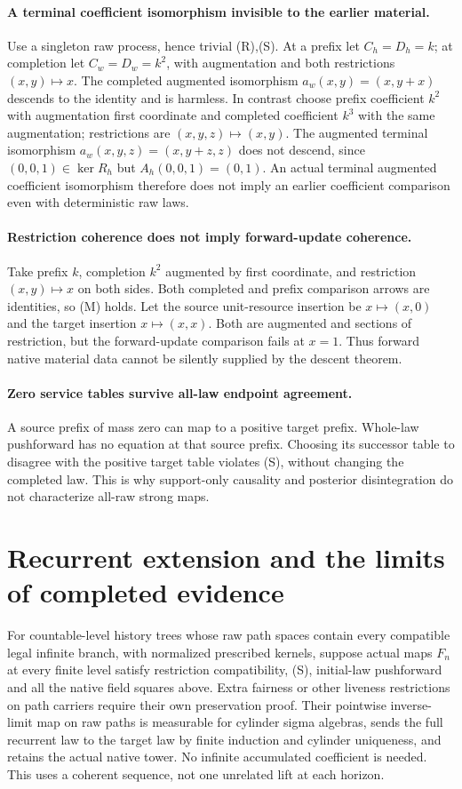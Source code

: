 \documentclass{article}
\begin{document}
\paragraph{A terminal coefficient isomorphism invisible to the earlier material.}
Use a singleton raw process, hence trivial (R),(S). At a prefix let $C_h=D_h=k$; at completion let $C_w=D_w=k^2$, with augmentation and both restrictions $(x,y)\mapsto x$. The completed augmented isomorphism $a_w(x,y)=(x,y+x)$ descends to the identity and is harmless. In contrast choose prefix coefficient $k^2$ with augmentation first coordinate and completed coefficient $k^3$ with the same augmentation; restrictions are $(x,y,z)\mapsto(x,y)$. The augmented terminal isomorphism $a_w(x,y,z)=(x,y+z,z)$ does not descend, since $(0,0,1)\in\ker R_h$ but $A_h(0,0,1)=(0,1)$. An actual terminal augmented coefficient isomorphism therefore does not imply an earlier coefficient comparison even with deterministic raw laws.

\paragraph{Restriction coherence does not imply forward-update coherence.}
Take prefix $k$, completion $k^2$ augmented by first coordinate, and restriction $(x,y)\mapsto x$ on both sides. Both completed and prefix comparison arrows are identities, so (M) holds. Let the source unit-resource insertion be $x\mapsto(x,0)$ and the target insertion $x\mapsto(x,x)$. Both are augmented and sections of restriction, but the forward-update comparison fails at $x=1$. Thus forward native material data cannot be silently supplied by the descent theorem.

\paragraph{Zero service tables survive all-law endpoint agreement.}
A source prefix of mass zero can map to a positive target prefix. Whole-law pushforward has no equation at that source prefix. Choosing its successor table to disagree with the positive target table violates (S), without changing the completed law. This is why support-only causality and posterior disintegration do not characterize all-raw strong maps.

\section{Recurrent extension and the limits of completed evidence}
For countable-level history trees whose raw path spaces contain every compatible legal infinite branch, with normalized prescribed kernels, suppose actual maps $F_n$ at every finite level satisfy restriction compatibility, (S), initial-law pushforward and all the native field squares above. Extra fairness or other liveness restrictions on path carriers require their own preservation proof. Their pointwise inverse-limit map on raw paths is measurable for cylinder sigma algebras, sends the full recurrent law to the target law by finite induction and cylinder uniqueness, and retains the actual native tower. No infinite accumulated coefficient is needed. This uses a coherent sequence, not one unrelated lift at each horizon.
\end{document}
